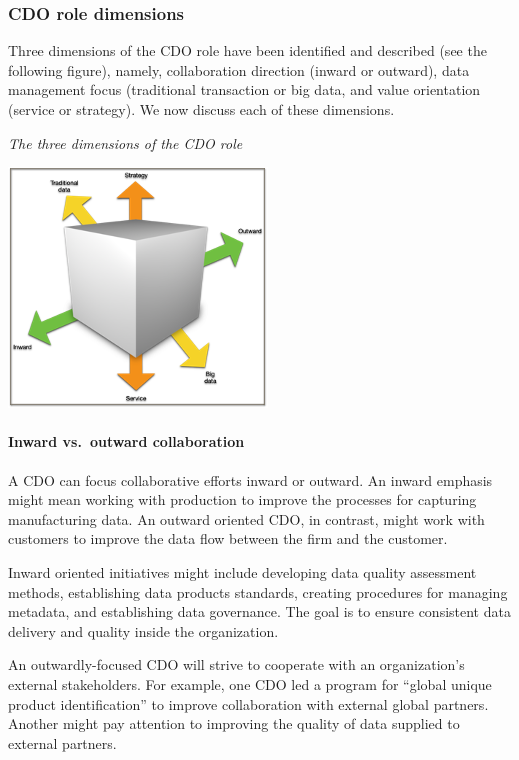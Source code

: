 \documentclass[
]{article}
\begin{document}
\hypertarget{cdo-role-dimensions}{%
\subsubsection*{CDO role dimensions}\label{cdo-role-dimensions}}

Three dimensions of the CDO role have been identified and described (see
the following figure), namely, collaboration direction (inward or
outward), data management focus (traditional transaction or big data,
and value orientation (service or strategy). We now discuss each of
these dimensions.

\emph{The three dimensions of the CDO role}

\includegraphics{Figures/Chapter 24/cdo.png}

\hypertarget{inward-vs.-outward-collaboration}{%
\paragraph*{Inward vs.~outward collaboration}\label{inward-vs.-outward-collaboration}}

A CDO can focus collaborative efforts inward or outward. An inward
emphasis might mean working with production to improve the processes for
capturing manufacturing data. An outward oriented CDO, in contrast,
might work with customers to improve the data flow between the firm and
the customer.

Inward oriented initiatives might include developing data quality
assessment methods, establishing data products standards, creating
procedures for managing metadata, and establishing data governance. The
goal is to ensure consistent data delivery and quality inside the
organization.

An outwardly-focused CDO will strive to cooperate with an organization's
external stakeholders. For example, one CDO led a program for ``global
unique product identification'' to improve collaboration with external
global partners. Another might pay attention to improving the quality of
data supplied to external partners.
\end{document}
